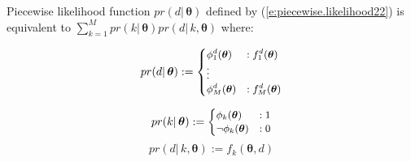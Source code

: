 \begin{proposition}
\label{pro:discrete}
Piecewise likelihood function $pr(d | \, \boldsymbol\theta)$ 
defined by (\ref{e:piecewise.likelihood22}) is equivalent to 
$\sum_{k = 1}^M pr(k | \, \boldsymbol\theta) pr(d | \, k, \boldsymbol\theta)$
where:

\noindent\begin{minipage}{.5\linewidth}
\begin{equation}
\label{e:piecewise.likelihood22}
pr(d | \, \boldsymbol\theta) :=
{\footnotesize
\begin{cases}
\phi^d_1(\boldsymbol\theta)  &: f^d_1(\boldsymbol\theta)\\
\vdots\\
\phi^d_M(\boldsymbol\theta)  &: f^d_M(\boldsymbol\theta)
\end{cases}
}%
\end{equation} 
\end{minipage}%
\begin{minipage}{.5\linewidth}
\begin{equation}
\label{e:2rel22}
pr(k |\, \boldsymbol\theta) := 
{\footnotesize
\begin{cases}
\phi_k(\boldsymbol\theta)  &: 1\\
\neg \phi_k(\boldsymbol\theta) &: 0
\end{cases}
}%
\end{equation}
\begin{equation}
\label{e:2rel222}
  pr(d | \, k, \boldsymbol\theta) := f_k(\boldsymbol\theta, d)
\end{equation}
\end{minipage}

%
\end{proposition}

